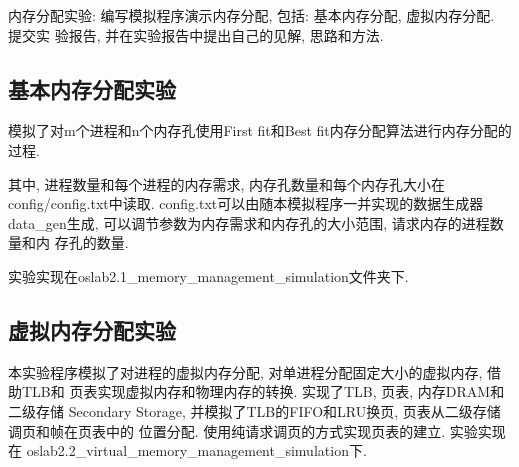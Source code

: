 内存分配实验: 编写模拟程序演示内存分配, 包括: 基本内存分配, 虚拟内存分配. 提交实
验报告, 并在实验报告中提出自己的见解, 思路和方法.

\subsection{基本内存分配实验}
模拟了对m个进程和n个内存孔使用First fit和Best fit内存分配算法进行内存分配的过程.\par

其中, 进程数量和每个进程的内存需求, 内存孔数量和每个内存孔大小在
config/config.txt中读取. config.txt可以由随本模拟程序一并实现的数据生成器
data\_gen生成, 可以调节参数为内存需求和内存孔的大小范围, 请求内存的进程数量和内
存孔的数量. \par
实验实现在oslab2.1\_memory\_management\_simulation文件夹下.

\subsection{虚拟内存分配实验}
本实验程序模拟了对进程的虚拟内存分配, 对单进程分配固定大小的虚拟内存, 借助TLB和
页表实现虚拟内存和物理内存的转换. 实现了TLB, 页表, 内存DRAM和二级存储
Secondary Storage, 并模拟了TLB的FIFO和LRU换页, 页表从二级存储调页和帧在页表中的
位置分配. 使用纯请求调页的方式实现页表的建立. 实验实现在
oslab2.2\_virtual\_memory\_management\_simulation下.
